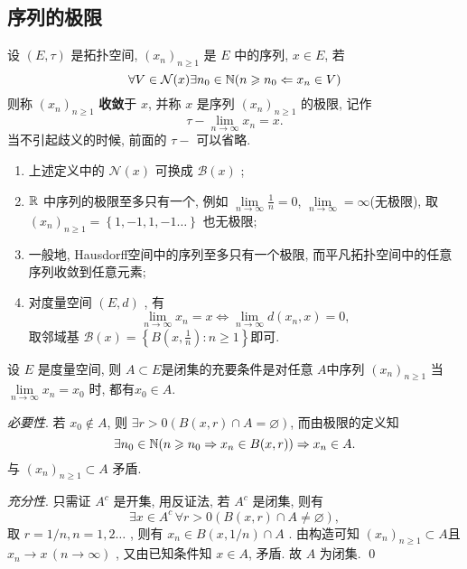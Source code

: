  \subsection{序列的极限}
 \begin{Def}[极限]\label{def:极限}
       设 $ (E, \tau) $ 是拓扑空间, $ (x_{n})_{n\geqslant 1} $ 是 $ E $ 中的序列,  $ x\in E $, 若
       \[
            \forall V\in\mathcal{N}(x)\exists n_{0}\in\mathbb{N}(n\geqslant n_{0}\Leftarrow x_{n}\in V)
       \]
       则称 $ (x_{n})_{n\geqslant1} $ \textbf{收敛}于 $ x $, 并称 $ x $ 是序列 $ (x_{n})_{n\geqslant1} $ 的极限, 记作
       \[
            \tau-\lim_{n\to \infty}x_{n}=x. 
       \] 
       当不引起歧义的时候, 前面的 $ \tau- $ 可以省略. 
 \end{Def}
\begin{Rmk}
     \begin{enumerate}[(1)]
          \item 上述定义中的 $ \mathcal{N}(x) $ 可换成 $ \mathcal{B}(x) $ ;
          \item $ \mathbb{R} $ 中序列的极限至多只有一个, 例如 $\lim\limits_{n\to\infty}\frac{1}{n}=0 $, $ \lim\limits_{n\to\infty} =\infty$(无极限), 取 $ (x_{n})_{n\geqslant1}=\left\{ 1, -1, 1,  -1\ldots \right\} $ 也无极限;
          \item 一般地, Hausdorff空间中的序列至多只有一个极限, 而平凡拓扑空间中的任意序列收敛到任意元素;
          \item 对度量空间 $ (E, d) $ , 有
          \[
               \lim_{n\to \infty}x_{n}=x \Leftrightarrow \lim_{n\to\infty}d(x_{n}, x)=0, 
          \]
          取邻域基 $ \mathcal{B}(x)=\left\{ B(x, \frac{1}{n}): n\geqslant1 \right\} $即可.  
     \end{enumerate}
\end{Rmk}
\begin{Prop}
     设 $ E $ 是度量空间, 则 $ A\subset E $是闭集的充要条件是对任意 $ A $中序列  $ (x_{n})_{n\geqslant1} $ 当 $ \lim\limits_{n\to\infty}x_{n}=x_{0} $ 时, 都有$ x_{0}\in A $.  
\end{Prop}
\begin{Prf}
     \textit{必要性}. 若 $ x_{0}\notin A $, 则 $ \exists r>0 (B(x, r)\cap A=\varnothing) $, 而由极限的定义知 
     \[
          \exists n_{0}\in\mathbb{N}(n\geqslant n_{0}\Rightarrow x_{n}\in B(x, r))\Rightarrow x_{n}\in A. 
     \]
     与 $ (x_{n})_{n\geqslant1}\subset A $ 矛盾. 

     \textit{充分性}. 只需证 $ A^{c} $ 是开集, 用反证法, 若 $ A^{c} $ 是闭集, 则有
     \[
          \exists x\in A^{c}\,\forall r>0(B(x, r)\cap A\neq\varnothing),
     \]
     取 $ r=1/n, n=1, 2\ldots $ , 则有 $ x_{n}\in B(x, 1/n)\cap A $ . 由构造可知 $ (x_{n})_{n\geqslant1}\subset A $且 $ x_{n}\to x\,(n\to\infty) $  , 又由已知条件知 $ x\in A $, 矛盾. 故 $ A $ 为闭集. \qed 
\end{Prf}
